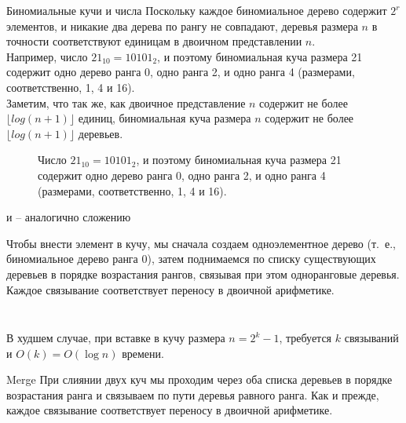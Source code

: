 \documentclass[aspectratio=169
  , xcolor={svgnames}
  , hyperref={ colorlinks,citecolor=DeepPink4
             , linkcolor=DarkRed,urlcolor=DarkBlue}
  , russian
  ]{beamer}
\theoremstyle{exerciseStyle1}
\begin{document}
\begin{frame}[fragile]{Биномиальные кучи и числа}
Поскольку каждое биномиальное дерево содержит $2^r$ элементов, и
никакие два дерева по рангу не совпадают, деревья размера $n$ в
точности соответствуют единицам в двоичном представлении
$n$.\\

Например, число $21_{10} = 10101_2$, и поэтому
биномиальная куча размера 21 содержит одно дерево ранга 0, одно ранга
2, и одно ранга 4 (размерами, соответственно, 1, 4 и 16).\\

Заметим, что
так же, как двоичное представление $n$ содержит не более $\lfloor log
(n+1)\rfloor$ единиц, биномиальная куча размера $n$ содержит не более
$\lfloor log(n+1) \rfloor$ деревьев.
\end{frame}


\begin{frame}[fragile]{}
\begin{figure}[h]
  \centering
  
  \caption{Число $21_{10} = 10101_2$, и поэтому
    биномиальная куча размера 21 содержит одно дерево ранга 0, одно ранга
    2, и одно ранга 4 (размерами, соответственно, 1, 4 и 16).}
\end{figure}

\end{frame}


\begin{frame}[fragile]{ и  -- аналогично сложению}

Чтобы внести элемент в кучу,
мы сначала создаем одноэлементное дерево (т.~е., биномиальное дерево
ранга 0), затем поднимаемся по списку существующих деревьев в порядке
возрастания рангов, связывая при этом одноранговые деревья. Каждое
связывание соответствует переносу в двоичной арифметике.

\inputminted[firstline=8,lastline=8] {haskell}{code/BinomialHeap.lhs}
\inputminted[firstline=16,lastline=18] {haskell}{code/BinomialHeap.lhs}

В худшем случае, при вставке в кучу размера $n = 2^k -1$, требуется
$k$ связываний и $O(k) = O(\log n)$ времени.
\end{frame}


\begin{frame}[fragile]{Merge}
При слиянии двух куч мы проходим через оба списка деревьев в порядке
возрастания ранга и связываем по пути деревья равного ранга. Как и
прежде, каждое связывание соответствует переносу в двоичной
арифметике.

\inputminted[firstline=20,lastline=25] {haskell}{code/BinomialHeap.lhs}

\inputminted[firstline=38,lastline=38,gobble=2] {haskell}{code/BinomialHeap.lhs}

\end{frame}
\end{document}

